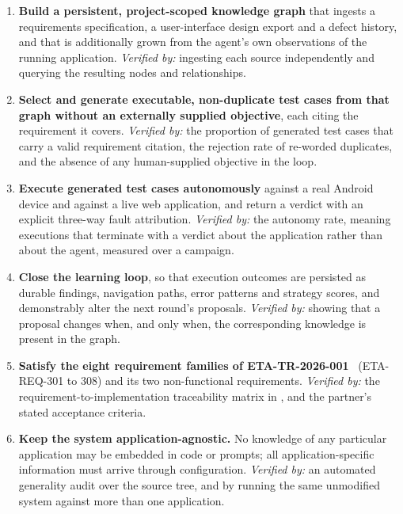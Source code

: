 \begin{enumerate}[label=\textbf{O\arabic*.},leftmargin=3.2em]
  \item \textbf{Build a persistent, project-scoped knowledge graph} that ingests
    a requirements specification, a user-interface design export and a defect
    history, and that is additionally grown from the agent's own observations of
    the running application.
    \emph{Verified by:} ingesting each source independently and querying the
    resulting nodes and relationships.

  \item \textbf{Select and generate executable, non-duplicate test cases from
    that graph without an externally supplied objective}, each citing the
    requirement it covers.
    \emph{Verified by:} the proportion of generated test cases that carry a
    valid requirement citation, the rejection rate of re-worded duplicates, and
    the absence of any human-supplied objective in the loop.

  \item \textbf{Execute generated test cases autonomously} against a real
    Android device and against a live web application, and return a verdict with
    an explicit three-way fault attribution.
    \emph{Verified by:} the autonomy rate, meaning executions that terminate with a verdict about the application rather than about the agent, measured over a campaign.

  \item \textbf{Close the learning loop}, so that execution outcomes are
    persisted as durable findings, navigation paths, error patterns and strategy
    scores, and demonstrably alter the next round's proposals.
    \emph{Verified by:} showing that a proposal changes when, and only when, the
    corresponding knowledge is present in the graph.

  \item \textbf{Satisfy the eight requirement families of
    ETA-TR-2026-001}~\cite{etatr} (ETA-REQ-301 to 308) and its two non-functional
    requirements.
    \emph{Verified by:} the requirement-to-implementation traceability matrix in
    , and the partner's stated acceptance criteria.

  \item \textbf{Keep the system application-agnostic.} No knowledge of any
    particular application may be embedded in code or prompts; all
    application-specific information must arrive through configuration.
    \emph{Verified by:} an automated generality audit over the source tree, and
    by running the same unmodified system against more than one application.


\end{enumerate}
